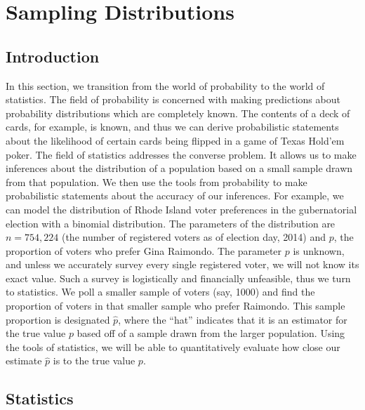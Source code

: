 \documentclass[notes.tex]{subfiles}
\begin{document}
\setcounter{section}{4}
\section{Sampling Distributions}

\subsection{Introduction}

In this section, we transition from the world of probability to the world of statistics. The field of probability is concerned with making predictions about probability distributions which are completely known. The contents of a deck of cards, for example, is known, and thus we can derive probabilistic statements about the likelihood of certain cards being flipped in a game of Texas Hold'em poker. The field of statistics addresses the converse problem. It allows us to make inferences about the distribution of a population based on a small sample drawn from that population. We then use the tools from probability to make probabilistic statements about the accuracy of our inferences. For example, we can model the distribution of Rhode Island voter preferences in the gubernatorial election with a binomial distribution. The parameters of the distribution are $n = 754,224$ (the number of registered voters as of election day, 2014) and $p$, the proportion of voters who prefer Gina Raimondo. The parameter $p$ is unknown, and unless we accurately survey every single registered voter, we will not know its exact value. Such a survey is logistically and financially unfeasible, thus we turn to statistics. We poll a smaller sample of voters (say, 1000) and find the proportion of voters in that smaller sample who prefer Raimondo. This sample proportion is designated $\hat{p}$, where the ``hat'' indicates that it is an estimator for the true value $p$ based off of a sample drawn from the larger population. Using the tools of statistics, we will be able to quantitatively evaluate how close our estimate $\hat{p}$ is to the true value $p$.\\

\subsection{Statistics}
\end{document}
